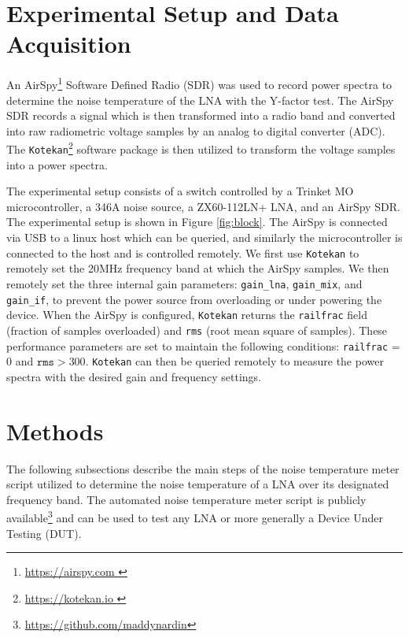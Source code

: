 \documentclass[twocolumn]{aastex631}
\begin{document}
\section{Experimental Setup and Data Acquisition} \label{sec:setup}
\label{sec:setup}
An AirSpy\footnote{\url{ https://airspy.com }} Software Defined Radio (SDR) was used to record  power spectra to determine the noise temperature of the LNA with the Y-factor test. The AirSpy SDR records a signal which is then transformed into a radio band and converted into raw radiometric voltage samples by an analog to digital converter (ADC). The \texttt{Kotekan}\footnote{\url{ https://kotekan.io }} software package is then utilized to transform the voltage samples into a power spectra.  

The experimental setup consists of a switch controlled by a Trinket MO microcontroller, a 346A noise source, a ZX60-112LN+ LNA, and an AirSpy SDR. The experimental setup is shown in Figure \ref{fig:block}. The AirSpy is connected via USB to a linux host which can be queried, and similarly the microcontroller is connected to the host and is controlled remotely. We first use \texttt{Kotekan} to remotely set the 20MHz frequency band at which the AirSpy samples. We then remotely set the three internal gain parameters: \texttt{gain\_lna}, \texttt{gain\_mix}, and \texttt{gain\_if}, to  prevent the power source from overloading or under powering the device. When the AirSpy is configured, \texttt{Kotekan} returns the \texttt{railfrac} field (fraction of samples overloaded) and \texttt{rms} (root mean square of samples). These performance parameters are set to maintain the following conditions:  \texttt{railfrac} = 0 and $\texttt{rms}>300$. \texttt{Kotekan} can then be queried remotely to measure the power spectra with the desired gain and frequency settings.

\section{Methods}\label{sec:methods}
The following subsections describe the main steps of the noise temperature meter script utilized to determine the noise temperature of a LNA over its designated frequency band. The automated noise temperature meter script is publicly available\footnote{\url{https://github.com/maddynardin}} and can be used to test any LNA or more generally a Device Under Testing (DUT).
\end{document}

